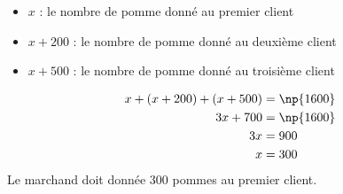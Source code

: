 %
%
    \begin{itemize}[label=\faAngleRight]
        \item $x$ : le nombre de pomme donné au premier client
        \item $x+200$ : le nombre de pomme donné au deuxième client
        \item $x+500$ : le nombre de pomme donné au troisième client
    \end{itemize}
    \begin{align*}
        x+(x+200)+(x+500) & =\np{1600}  \\
        3x + 700          & = \np{1600} \\
        3x                & = 900       \\
        x                 & = 300
    \end{align*}
    Le marchand doit donnée 300 pommes au premier client.
